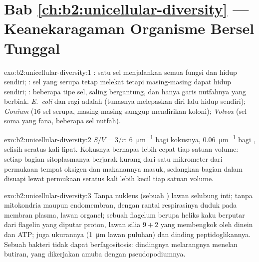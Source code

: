 \section*{Bab \ref{ch:b2:unicellular-diversity} --- Keanekaragaman Organisme Bersel Tunggal}

\begin{solution}{exo:b2:unicellular-diversity:1}
: satu sel menjalankan semua fungsi dan hidup sendiri;
: sel yang serupa tetap melekat tetapi masing-masing dapat
hidup sendiri; : beberapa tipe sel, saling bergantung,
dan hanya garis nutfahnya yang berbiak. \emph{E.~coli} dan ragi
adalah  (tunasnya melepaskan diri lalu hidup sendiri);
\emph{Gonium}  (16 sel serupa, masing-masing sanggup
mendirikan koloni); \emph{Volvox}  (sel soma yang fana,
beberapa sel nutfah).
\end{solution}

\begin{solution}{exo:b2:unicellular-diversity:2}
$S/V = 3/r$: \qty{6}{\micro m^{-1}} bagi kokusnya,
\qty{0.06}{\micro m^{-1}} bagi , selisih seratus kali lipat.
Kokusnya bernapas lebih cepat tiap satuan volume: setiap bagian
sitoplasmanya berjarak kurang dari satu mikrometer dari permukaan
tempat oksigen dan makanannya masuk, sedangkan bagian dalam 
disuapi lewat permukaan seratus kali lebih kecil tiap satuan volume.
\end{solution}

\begin{solution}{exo:b2:unicellular-diversity:3}
Tanpa nukleus (sebuah ) lawan selubung inti; tanpa mitokondria
maupun endomembran, dengan rantai respirasinya duduk pada membran
plasma, lawan organel; sebuah flagelum berupa heliks kaku berputar dari
flagelin yang diputar proton, lawan silia $9+2$ yang membengkok oleh
dinein dan ATP; juga ukurannya (\qty{1}{\micro m} lawan puluhan) dan
dinding peptidoglikannya. Sebuah bakteri tidak dapat berfagositosis:
dindingnya melarangnya menelan butiran, yang dikerjakan amuba dengan
pseudopodiumnya.
\end{solution}

